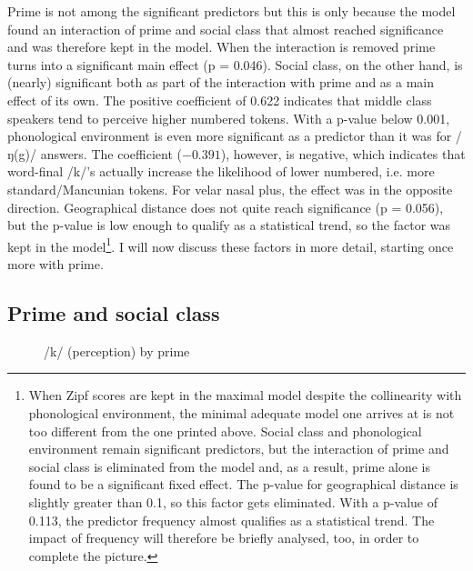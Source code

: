 Prime is not among the significant predictors but this is only because the model found an interaction of prime and social class that almost reached significance and was therefore kept in the model.
When the interaction is removed prime turns into a significant main effect (p = 0.046).
Social class, on the other hand, is (nearly) significant both as part of the interaction with prime and as a main effect of its own.
The positive coefficient of 0.622 indicates that middle class speakers tend to perceive higher numbered tokens.
With a p-value below 0.001, phonological environment is even more significant as a predictor than it was for /ŋ(g)/ answers.
The coefficient (\ensuremath{-0.391}), however, is negative, which indicates that word-final /k/'s actually increase the likelihood of lower numbered, i.e. more standard/Mancunian tokens.
For velar nasal plus, the effect was in the opposite direction.
Geographical distance does not quite reach significance (p = 0.056), but the p-value is low enough to qualify as a statistical trend, so the factor was kept in the model\footnote{When Zipf scores are kept in the maximal model despite the collinearity with phonological environment, the minimal adequate model one arrives at is not too different from the one printed above. Social class and phonological environment remain significant predictors, but the interaction of prime and social class is eliminated from the model and, as a result, prime alone is found to be a significant fixed effect. The p-value for geographical distance is slightly greater than 0.1, so this factor gets eliminated. With a p-value of 0.113, the predictor frequency almost qualifies as a statistical trend. The impact of frequency will therefore be briefly analysed, too, in order to complete the picture.}.
I will now discuss these factors in more detail, starting once more with prime.

\subsection{Prime and social class}
\label{sec.perc_res.k.prime}

\begin{figure}[h]
	\centering
		\resizebox{.49\linewidth}{!}{} 
	\caption{/k/ (perception) by prime}
	\label{fig.bar.k.tot.ext}
\end{figure}

